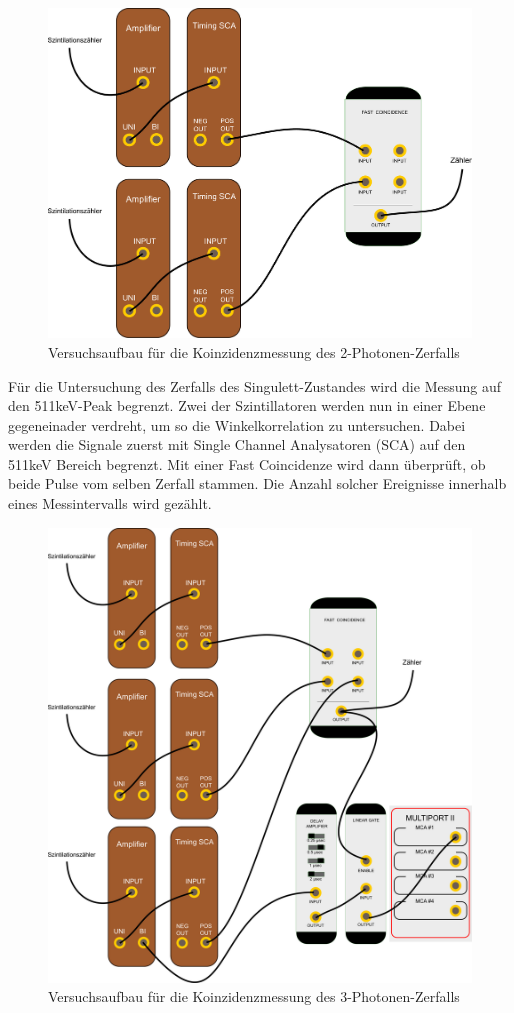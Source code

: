 \begin{figure}
 \includegraphics[width=\textwidth]{BilderAufbau/2er-koinzidenz.pdf}
 \caption{Versuchsaufbau für die Koinzidenzmessung des 2-Photonen-Zerfalls}
\end{figure}

Für die Untersuchung des Zerfalls des Singulett-Zustandes wird die Messung auf den 511keV-Peak begrenzt. Zwei der Szintillatoren werden nun in einer Ebene gegeneinader verdreht, um so die Winkelkorrelation zu untersuchen. Dabei werden die Signale zuerst mit Single Channel Analysatoren (SCA) auf den 511keV Bereich begrenzt. Mit einer Fast Coincidenze wird dann überprüft, ob beide Pulse vom selben Zerfall stammen. Die Anzahl solcher Ereignisse innerhalb eines Messintervalls wird gezählt. 


\begin{figure}
 \includegraphics[width=\textwidth]{BilderAufbau/3er-koinzidenz.pdf}
 \caption{Versuchsaufbau für die Koinzidenzmessung des 3-Photonen-Zerfalls}
\end{figure}

